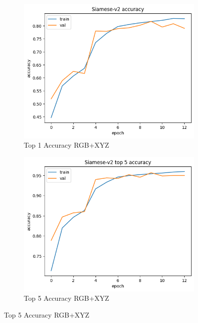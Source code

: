 \begin{figure}[htbp]
  \centering

  \begin{subfigure}[b]{0.45\textwidth}
    \includegraphics[width=\textwidth]{graphics/images/results/v2-accu1-rgbxyz.png}
    \caption{Top 1 Accuracy RGB+XYZ}
    \label{fig:v2-accu1-rgbxyz}
  \end{subfigure}
  \hfill
  \begin{subfigure}[b]{0.45\textwidth}
    \includegraphics[width=\textwidth]{graphics/images/results/v2-accu5-rgbxyz.png}
    \caption{Top 5 Accuracy RGB+XYZ}
    \label{fig:v2-accu5-rgbxyz}

\end{subfigure}
\end{figure}
